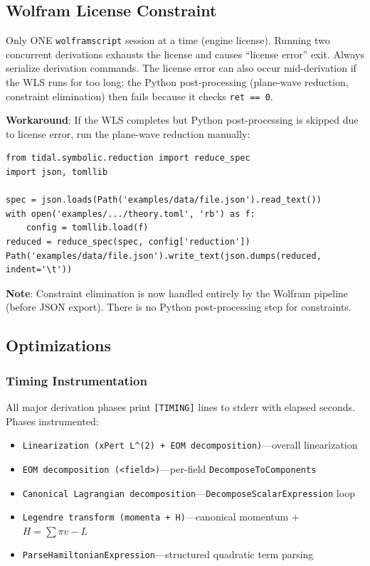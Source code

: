 \subsection{Wolfram License Constraint}
\label{sec:license-constraint}

Only ONE \texttt{wolframscript} session at a time (engine license). Running two concurrent derivations exhausts the license and causes ``license error'' exit. Always serialize derivation commands. The license error can also occur mid-derivation if the WLS runs for too long; the Python post-processing (plane-wave reduction, constraint elimination) then fails because it checks \texttt{ret == 0}.

\textbf{Workaround}: If the WLS completes but Python post-processing is skipped due to license error, run the plane-wave reduction manually:

\begin{lstlisting}[style=python]
from tidal.symbolic.reduction import reduce_spec
import json, tomllib

spec = json.loads(Path('examples/data/file.json').read_text())
with open('examples/.../theory.toml', 'rb') as f:
    config = tomllib.load(f)
reduced = reduce_spec(spec, config['reduction'])
Path('examples/data/file.json').write_text(json.dumps(reduced, indent='\t'))
\end{lstlisting}

\textbf{Note}: Constraint elimination is now handled entirely by the Wolfram pipeline (before JSON export). There is no Python post-processing step for constraints.


\subsection{Optimizations}
\label{sec:optimizations}

\subsubsection{Timing Instrumentation}

All major derivation phases print \texttt{[TIMING]} lines to stderr with elapsed seconds. Phases instrumented:

\begin{itemize}
  \item \texttt{Linearization (xPert L\^{}(2) + EOM decomposition)}---overall linearization
  \item \texttt{EOM decomposition (<field>)}---per-field \texttt{DecomposeToComponents}
  \item \texttt{Canonical Lagrangian decomposition}---\texttt{DecomposeScalarExpression} loop
  \item \texttt{Legendre transform (momenta + H)}---canonical momentum + $H = \sum \pi v - L$
  \item \texttt{ParseHamiltonianExpression}---structured quadratic term parsing
\end{itemize}

